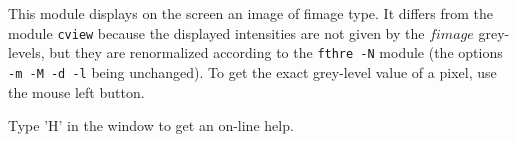 This module displays on the screen an image of fimage type.
It differs from the module \verb+cview+ because
the displayed intensities are not given by the $fimage$ grey-levels,
but they are renormalized according to the \verb+fthre -N+ module
(the options \verb+-m -M -d -l+ being unchanged).
To get the exact grey-level value of a pixel, use the mouse left
button.

Type 'H' in the window to get an on-line help.

